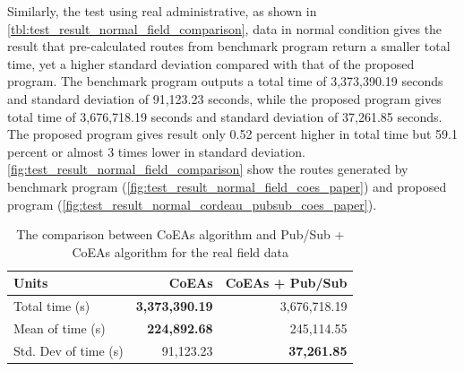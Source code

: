 \documentclass[conference]{IEEEtran}
\newcommand{\ra}[1]{\renewcommand{\arraystretch}{#1}}
\begin{document}
Similarly, the test using real administrative, as shown in \autoref{tbl:test_result_normal_field_comparison}, data in normal condition gives the result that pre-calculated routes from benchmark program return a smaller total time, yet a higher standard deviation compared with that of the proposed program. The benchmark program outputs a total time of 3,373,390.19 seconds and standard deviation of 91,123.23 seconds, while the proposed program gives total time of 3,676,718.19 seconds and standard deviation of 37,261.85 seconds. The proposed program gives result only 0.52 percent higher in total time but 59.1 percent or almost 3 times lower in standard deviation. \autoref{fig:test_result_normal_field_comparison} show the routes generated by benchmark program (\autoref{fig:test_result_normal_field_coes_paper}) and proposed program (\autoref{fig:test_result_normal_cordeau_pubsub_coes_paper}).

\begin{table}[!]
	\centering
	\ra{1.3}
	\caption{The comparison between CoEAs algorithm and Pub/Sub + CoEAs algorithm for the real field data}
	\label{tbl:test_result_normal_field_comparison}
	\begin{tabular}{lrr}
		\toprule
		Units & CoEAs & CoEAs + Pub/Sub\\ 
		\midrule
		Total time (s) & \textbf{3,373,390.19} & 3,676,718.19\\
		Mean of time (s) & \textbf{224,892.68} & 245,114.55\\
		Std. Dev of time (s) & 91,123.23 & \textbf{37,261.85}\\
		\bottomrule
	\end{tabular}
\end{table}
\end{document}
